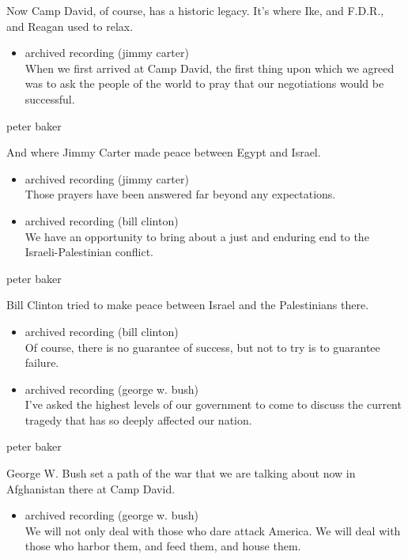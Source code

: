 Now Camp David, of course, has a historic legacy. It's where Ike, and
F.D.R., and Reagan used to relax.

\begin{itemize}
\tightlist
\item
  archived recording (jimmy carter)\\
  When we first arrived at Camp David, the first thing upon which we
  agreed was to ask the people of the world to pray that our
  negotiations would be successful.
\end{itemize}

peter baker

And where Jimmy Carter made peace between Egypt and Israel.

\begin{itemize}
\item
  archived recording (jimmy carter)\\
  Those prayers have been answered far beyond any expectations.
\item
  archived recording (bill clinton)\\
  We have an opportunity to bring about a just and enduring end to the
  Israeli-Palestinian conflict.
\end{itemize}

peter baker

Bill Clinton tried to make peace between Israel and the Palestinians
there.

\begin{itemize}
\item
  archived recording (bill clinton)\\
  Of course, there is no guarantee of success, but not to try is to
  guarantee failure.
\item
  archived recording (george w. bush)\\
  I've asked the highest levels of our government to come to discuss the
  current tragedy that has so deeply affected our nation.
\end{itemize}

peter baker

George W. Bush set a path of the war that we are talking about now in
Afghanistan there at Camp David.

\begin{itemize}
\tightlist
\item
  archived recording (george w. bush)\\
  We will not only deal with those who dare attack America. We will deal
  with those who harbor them, and feed them, and house them.
\end{itemize}

